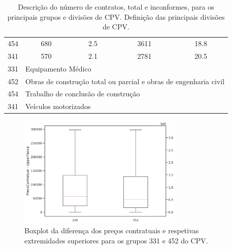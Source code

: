 \begin{table}[H]
{\begin{tabular}{ccccc}
		454                  & 680                                                                                         & 2.5                                & 3611                                                                                  & 18.8                           \\
		341                  & 570                                                                                         & 2.1                                & 2781                                                                                  & 20.5                           \\ \hline
		331                  & \multicolumn{4}{l}{Equipamento Médico}                                                                                                                                                                                                                    \\
		452                  & \multicolumn{4}{l}{Obras de construção total ou parcial e obras de engenharia civil}                                                                                                                                                                      \\
		454                  & \multicolumn{4}{l}{Trabalho de conclusão de construção}                                                                                                                                                                                                   \\
		341                  & \multicolumn{4}{l}{Veículos motorizados}                                                                                                                                                                                                                  \\ \hline
	\end{tabular}%
	}
	\caption{Descrição do número de contratos, total e inconformes, para os principais grupos e divisões de CPV. Definição das principais divisões de CPV.}
	\label{tab:rf17stats}
\end{table}


\begin{figure}[H]
	\centering
	\includegraphics[width=0.7\textwidth]{imagens/r017/diffs.png}
	\caption{Boxplot da diferença dos preços contratuais e respetivas extremidades superiores para os grupos 331 e 452 do CPV.}
	\label{fig:diffscpvs}
\end{figure}

